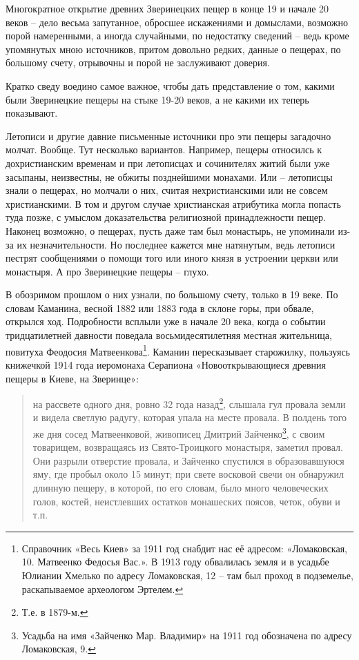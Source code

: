 Многократное открытие древних Зверинецких пещер в конце 19 и начале 20 веков – дело весьма запутанное, обросшее искажениями и домыслами, возможно порой намеренными, а иногда случайными, по недостатку сведений – ведь кроме упомянутых мною источников, притом довольно редких, данные о пещерах, по большому счету, отрывочны и порой не заслуживают доверия.


Кратко сведу воедино самое важное, чтобы дать представление о том, какими были Зверинецкие пещеры на стыке 19-20 веков, а не какими их теперь показывают.

Летописи и другие давние письменные источники про эти пещеры загадочно молчат. Вообще. Тут несколько вариантов. Например, пещеры относилсь к дохристианским временам и при летописцах и сочинителях житий были уже засыпаны, неизвестны, не обжиты позднейшими монахами. Или – летописцы знали о пещерах, но молчали о них, считая нехристианскими или не совсем христианскими. В том и другом случае христианская атрибутика могла попасть туда позже, с умыслом доказательства религиозной принадлежности пещер. Наконец возможно, о пещерах, пусть даже там был монастырь, не упоминали из-за их незначительности. Но последнее кажется мне натянутым, ведь летописи пестрят сообщениями о помощи того или иного князя в устроении церкви или монастыря. А про Зверинецкие пещеры – глухо.

В обозримом прошлом о них узнали, по большому счету, только в 19 веке. По словам Каманина, весной 1882 или 1883 года в склоне горы, при обвале, открылся ход. Подробности всплыли уже в начале 20 века, когда о событии тридцатилетней давности поведала восьмидесятилетняя местная жительница, повитуха Феодосия Матвеенкова\footnote{Справочник «Весь Киев» за 1911 год снабдит нас её адресом: «Ломаковская, 10. Матвеенко Федосья Вас.». В 1913 году обвалилась земля и в усадьбе Юлиании Хмелько по адресу Ломаковская, 12 – там был проход в подземелье, раскапываемое археологом Эртелем.}. Каманин пересказывает старожилку, пользуясь книжечкой 1914 года иеромонаха Серапиона «Новооткрывающиеся древния пещеры в Киеве, на Зверинце»:

\begin{quotation}
на рассвете одного дня, ровно 32 года назад\footnote{Т.е. в 1879-м.}, слышала гул провала земли и видела светлую радугу, которая упала на месте провала. В полдень того же дня сосед Матвеенковой, живописец Дмитрий Зайченко\footnote{Усадьба на имя «Зайченко Мар. Владимир» на 1911 год обозначена по адресу Ломаковская, 9.}, с своим товарищем, возвращаясь из Свято-Троицкого монастыря, заметил провал. Они разрыли отверстие провала, и Зайченко спустился в образовавшуюся яму, где пробыл около 15 минут; при свете восковой свечи он обнаружил длинную пещеру, в которой, по его словам, было много человеческих голов, костей, неистлевших остатков монашеских поясов, четок, обуви и т.п.
\end{quotation}

